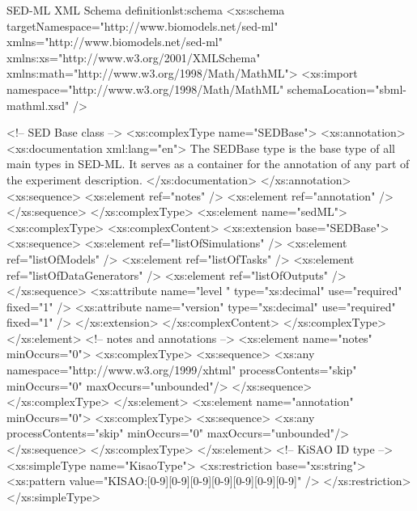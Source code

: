 \footnotesize
\begin{myXmlLst}{SED-ML XML Schema definition}{lst:schema}
<xs:schema targetNamespace="http://www.biomodels.net/sed-ml" xmlns="http://www.biomodels.net/sed-ml"
	xmlns:xs="http://www.w3.org/2001/XMLSchema" xmlns:math="http://www.w3.org/1998/Math/MathML">
	<xs:import namespace="http://www.w3.org/1998/Math/MathML"
		schemaLocation="sbml-mathml.xsd" />

<!-- SED Base class -->
	<xs:complexType name="SEDBase">
		<xs:annotation>
			<xs:documentation xml:lang="en">
			The SEDBase type is the base type of all main types in SED-ML. It serves as a container for the annotation of any part of the experiment description.
		</xs:documentation>
		</xs:annotation>
		<xs:sequence>
			<xs:element ref="notes"  />
			<xs:element ref="annotation" />
		</xs:sequence>
	</xs:complexType>
	<xs:element name="sedML">
		<xs:complexType>
			<xs:complexContent>
				<xs:extension base="SEDBase">
					<xs:sequence>
						<xs:element ref="listOfSimulations" />
						<xs:element ref="listOfModels" />
						<xs:element ref="listOfTasks" />
						<xs:element ref="listOfDataGenerators" />
						<xs:element ref="listOfOutputs" />
					</xs:sequence>
					<xs:attribute name="level " type="xs:decimal" use="required"
						fixed="1" />
					<xs:attribute name="version" type="xs:decimal" use="required"
						fixed="1" />
				</xs:extension>
			</xs:complexContent>
		</xs:complexType>
	</xs:element>
<!-- notes and annotations -->
	<xs:element name="notes" minOccurs="0">
	 	<xs:complexType>
			 <xs:sequence>
				 <xs:any namespace="http://www.w3.org/1999/xhtml" processContents="skip" minOccurs="0" maxOccurs="unbounded"/>
			 </xs:sequence>
		</xs:complexType>
	</xs:element>
	<xs:element name="annotation" minOccurs="0">
		<xs:complexType>
			<xs:sequence>
				<xs:any processContents="skip" minOccurs="0" maxOccurs="unbounded"/>
			</xs:sequence>
		</xs:complexType>
	</xs:element>
<!-- KiSAO ID type -->
<xs:simpleType name="KisaoType">
   <xs:restriction base="xs:string">
     <xs:pattern value="KISAO:[0-9][0-9][0-9][0-9][0-9][0-9][0-9]" />
   </xs:restriction>
</xs:simpleType>
		

\end{myXmlLst}

